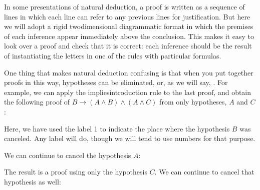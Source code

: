 \documentclass[letterpaper,10pt,english]{sphinxmanual}
\begin{document}
\begin{center}
\DP
\end{center}

\sphinxAtStartPar
In some presentations of natural deduction, a proof is written as a sequence of lines in which each line can refer to any previous lines for justification. But here we will adopt a rigid two\sphinxhyphen{}dimensional diagrammatic format in which the premises of each inference appear immediately above the conclusion. This makes it easy to look over a proof and check that it is correct: each inference should be the result of instantiating the letters in one of the rules with particular formulas.

\sphinxAtStartPar
One thing that makes natural deduction confusing is that when you put together proofs in this way, hypotheses can be eliminated, or, as we will say, . For example, we can apply the implies\sphinxhyphen{}introduction rule to the last proof, and obtain the following proof of \(B \to (A \wedge B) \wedge (A \wedge C)\) from only  hypotheses, \(A\) and \(C\):



\begin{center}
\AXM{}
\DP
\end{center}

\sphinxAtStartPar
Here, we have used the label 1 to indicate the place where the hypothesis \(B\) was canceled. Any label will do, though we will tend to use numbers for that purpose.

\sphinxAtStartPar
We can continue to cancel the hypothesis \(A\):



\begin{center}
\AXM{}
\AXM{}
\AXM{}
\DP
\end{center}

\sphinxAtStartPar
The result is a proof using only the hypothesis \(C\). We can continue to cancel that hypothesis as well:
\end{document}
